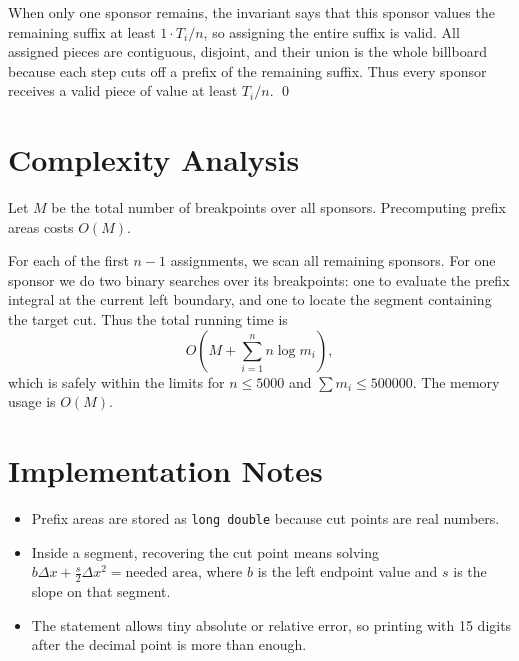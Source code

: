 \documentclass[11pt]{article}
\begin{document}
When only one sponsor remains, the invariant says that this sponsor values the remaining suffix at least
$1 \cdot T_i / n$, so assigning the entire suffix is valid. All assigned pieces are contiguous, disjoint, and
their union is the whole billboard because each step cuts off a prefix of the remaining suffix. Thus every
sponsor receives a valid piece of value at least $T_i / n$. \qed

\section*{Complexity Analysis}

Let $M$ be the total number of breakpoints over all sponsors. Precomputing prefix areas costs $O(M)$.

For each of the first $n-1$ assignments, we scan all remaining sponsors. For one sponsor we do two binary
searches over its breakpoints: one to evaluate the prefix integral at the current left boundary, and one to
locate the segment containing the target cut. Thus the total running time is
\[
O\!\left(M + \sum_{i=1}^{n} n \log m_i \right),
\]
which is safely within the limits for $n \le 5000$ and $\sum m_i \le 500000$. The memory usage is $O(M)$.

\section*{Implementation Notes}

\begin{itemize}[leftmargin=*]
    \item Prefix areas are stored as \texttt{long double} because cut points are real numbers.
    \item Inside a segment, recovering the cut point means solving
    $b \Delta x + \frac{s}{2} \Delta x^2 = \text{needed area}$, where $b$ is the left endpoint value and
    $s$ is the slope on that segment.
    \item The statement allows tiny absolute or relative error, so printing with 15 digits after the decimal
    point is more than enough.
\end{itemize}
\end{document}
